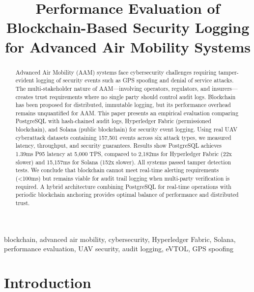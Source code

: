 \documentclass[conference]{IEEEtran}
\begin{document}
\title{Performance Evaluation of Blockchain-Based Security Logging for Advanced Air Mobility Systems}

\author{
}

\maketitle

\begin{abstract}
Advanced Air Mobility (AAM) systems face cybersecurity challenges requiring tamper-evident logging of security events such as GPS spoofing and denial of service attacks. The multi-stakeholder nature of AAM---involving operators, regulators, and insurers---creates trust requirements where no single party should control audit logs. Blockchain has been proposed for distributed, immutable logging, but its performance overhead remains unquantified for AAM. This paper presents an empirical evaluation comparing PostgreSQL with hash-chained audit logs, Hyperledger Fabric (permissioned blockchain), and Solana (public blockchain) for security event logging. Using real UAV cyberattack datasets containing 157,501 events across six attack types, we measured latency, throughput, and security guarantees. Results show PostgreSQL achieves 1.39ms P95 latency at 5,000 TPS, compared to 2,182ms for Hyperledger Fabric (22x slower) and 15,157ms for Solana (152x slower). All systems passed tamper detection tests. We conclude that blockchain cannot meet real-time alerting requirements (<100ms) but remains viable for audit trail logging when multi-party verification is required. A hybrid architecture combining PostgreSQL for real-time operations with periodic blockchain anchoring provides optimal balance of performance and distributed trust.
\end{abstract}

\begin{IEEEkeywords}
blockchain, advanced air mobility, cybersecurity, Hyperledger Fabric, Solana, performance evaluation, UAV security, audit logging, eVTOL, GPS spoofing
\end{IEEEkeywords}

\section{Introduction}
\end{document}
